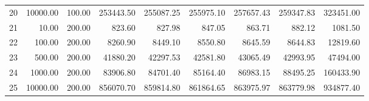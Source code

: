 \begin{table}[ht]
\begin{tabular}{rrrrrrrrr}
  20 & 10000.00 & 100.00 & 253443.50 & 255087.25 & 255975.10 & 257657.43 & 259347.83 & 323451.00 \\ 
  21 & 10.00 & 200.00 & 823.60 & 827.98 & 847.05 & 863.71 & 882.12 & 1081.50 \\ 
  22 & 100.00 & 200.00 & 8260.90 & 8449.10 & 8550.80 & 8645.59 & 8644.83 & 12819.60 \\ 
  23 & 500.00 & 200.00 & 41880.20 & 42297.53 & 42581.80 & 43065.49 & 42993.95 & 47494.00 \\ 
  24 & 1000.00 & 200.00 & 83906.80 & 84701.40 & 85164.40 & 86983.15 & 88495.25 & 160433.90 \\ 
  25 & 10000.00 & 200.00 & 856070.70 & 859814.80 & 861864.65 & 863975.97 & 863779.98 & 934877.40 \\ 
   \hline
\end{tabular}
\end{table}
